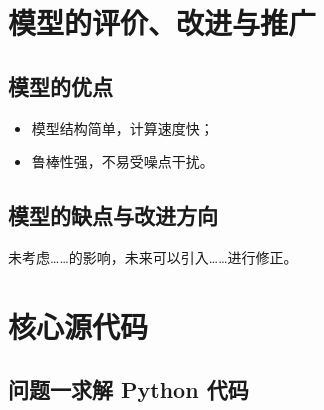 \documentclass[lang=cn,a4paper,newtx]{elegantpaper} %
\begin{document}
\section{模型的评价、改进与推广}
\subsection{模型的优点}
\begin{itemize}
    \item 模型结构简单，计算速度快；
    \item 鲁棒性强，不易受噪点干扰。
\end{itemize}
\subsection{模型的缺点与改进方向}
未考虑……的影响，未来可以引入……进行修正。

\printbibliography[heading=bibintoc, title=\ebibname]

\newpage
\appendix
\section{核心源代码}
\subsection{问题一求解 Python 代码}
\end{document}
